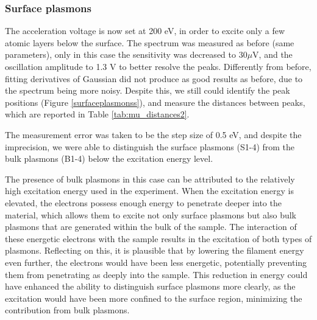 \documentclass[12pt]{article}
\begin{document}
\subsubsection{Surface plasmons}
The acceleration voltage is now set at 200 eV, in order to excite only a few atomic layers below the surface. The spectrum was measured as before (same parameters), only in this case the sensitivity was decreased to $30 \mu $V, and the oscillation amplitude to 1.3 V to better resolve the peaks. Differently from before, fitting derivatives of Gaussian did not produce as good results as before, due to the spectrum being more noisy. Despite this, we still could identify the peak positions (Figure \ref{surfaceplasmonss}), and measure the distances between peaks, which are reported in Table \ref{tab:mu_distances2}.

The measurement error was taken to be the step size of 0.5 eV, and despite the imprecision, we were able to distinguish the surface plasmons (S1-4) from the bulk plasmons (B1-4) below the excitation energy level.

The presence of bulk plasmons in this case can be attributed to the relatively high excitation energy used in the experiment. When the excitation energy is elevated, the electrons possess enough energy to penetrate deeper into the material, which allows them to excite not only surface plasmons but also bulk plasmons that are generated within the bulk of the sample. The interaction of these energetic electrons with the sample results in the excitation of both types of plasmons. Reflecting on this, it is plausible that by lowering the filament energy even further, the electrons would have been less energetic, potentially preventing them from penetrating as deeply into the sample. This reduction in energy could have enhanced the ability to distinguish surface plasmons more clearly, as the excitation would have been more confined to the surface region, minimizing the contribution from bulk plasmons.
\end{document}
